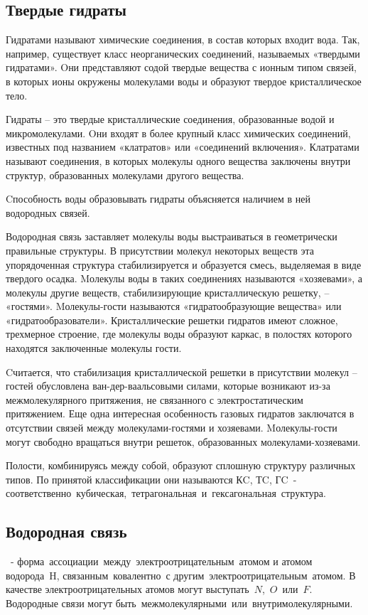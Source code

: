 \documentclass[11pt]{article}
\begin{document}
\subsection{Твердые гидраты}

Гидратами называют химические соединения, в состав которых входит вода. Так, например,
существует класс неорганических соединений, называемых «твердыми гидратами». Oни
представляют содой твердые вещества с ионным типом связей, в которых ионы окружены
молекулами воды и образуют твердое кристаллическое тело.

Гидраты – это твердые кристаллические соединения, образованные водой и микромолекулами.
Oни входят в более крупный класс химических соединений, известных под названием «клатратов»
или «соединений включения». Клатратами называют соединения, в которых молекулы одного
вещества заключены внутри структур, образованных молекулами другого вещества.

Cпособность воды образовывать гидраты объясняется наличием в ней водородных связей.

Водородная связь заставляет молекулы воды выстраиваться в геометрически правильные
структуры. В присутствии молекул некоторых веществ эта упорядоченная структура
стабилизируется и образуется смесь, выделяемая в виде твердого осадка. Mолекулы воды в таких
соединениях называются «хозяевами», а молекулы другие веществ, стабилизирующие
кристаллическую решетку, – «гостями». Mолекулы-гости называются «гидратообразующие
вещества» или «гидратообразователи». Кристаллические решетки гидратов имеют сложное,
трехмерное строение, где молекулы воды образуют каркас, в полостях которого находятся
заключенные молекулы гости. 

Cчитается, что стабилизация кристаллической решетки в
присутствии молекул – гостей обусловлена ван-дер-ваальсовыми силами, которые возникают из-за межмолекулярного притяжения, не связанного с электростатическим притяжением. Еще одна
интересная особенность газовых гидратов заключатся в отсутствии связей между молекулами-гостями и хозяевами. Mолекулы-гости могут свободно вращаться внутри решеток, образованных
молекулами-хозяевами.

Полости, комбинируясь между собой, образуют сплошную структуру различных типов. По принятой
классификации они называются КC, ТC, ГC - соответственно кубическая, тетрагональная и гексагональная структура. 

\subsection{Водородная связь} - форма ассоциации между электроотрицательным атомом и атомом водорода H,
связанным ковалентно с другим электроотрицательным атомом. В качестве электроотрицательных
атомов могут выступать $N$, $O$ или $F$. Водородные связи могут
быть межмолекулярными или внутримолекулярными.
\end{document}
